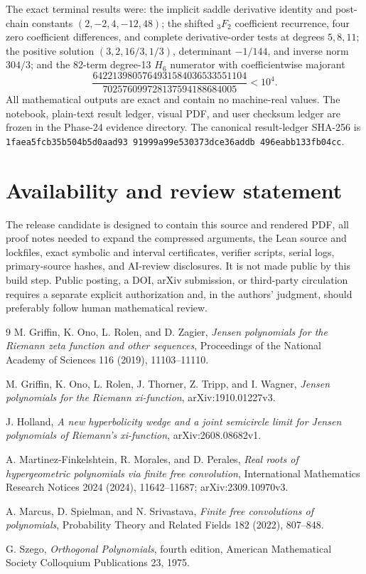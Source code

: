\documentclass[11pt]{article}
\theoremstyle{definition}
\theoremstyle{remark}
\begin{document}
The exact terminal results were: the implicit saddle derivative identity and
post-chain constants $(2,-2,4,-12,48)$; the shifted ${}_3F_2$ coefficient
recurrence, four zero coefficient differences, and complete derivative-order
tests at degrees $5,8,11$; the positive solution
$(3,2,16/3,1/3)$, determinant $-1/144$, and inverse norm $304/3$; and the
82-term degree-13 $H_6$ numerator with coefficientwise majorant
\[
 \frac{6422139805764931584036533551104}
 {702576099728137594188684005}<10^4.
\]
All mathematical outputs are exact and contain no machine-real values.  The
notebook, plain-text result ledger, visual PDF, and user checksum ledger are
frozen in the Phase-24 evidence directory.  The canonical result-ledger
SHA-256 is
\texttt{1faea5fc\allowbreak b35b504b\allowbreak 5d0aad93\allowbreak
91999a99\allowbreak e530373d\allowbreak ce36addb\allowbreak
496eabb1\allowbreak 33fb04cc}.

\section{Availability and review statement}

The release candidate is designed to contain this source and rendered PDF,
all proof notes needed to expand the compressed arguments, the Lean source
and lockfiles, exact symbolic and interval certificates, verifier scripts,
serial logs, primary-source hashes, and AI-review disclosures.  It is not
made public by this build step.  Public posting, a DOI, arXiv submission, or
third-party circulation requires a separate explicit authorization and, in
the authors' judgment, should preferably follow human mathematical review.

\begin{thebibliography}{9}
M. Griffin, K. Ono, L. Rolen, and D. Zagier,
\emph{Jensen polynomials for the Riemann zeta function and other sequences},
Proceedings of the National Academy of Sciences 116 (2019), 11103--11110.

M. Griffin, K. Ono, L. Rolen, J. Thorner, Z. Tripp, and I. Wagner,
\emph{Jensen polynomials for the Riemann xi-function},
arXiv:1910.01227v3.

J. Holland,
\emph{A new hyperbolicity wedge and a joint semicircle limit for Jensen
polynomials of Riemann's xi-function}, arXiv:2608.08682v1.

A. Martinez-Finkelshtein, R. Morales, and D. Perales,
\emph{Real roots of hypergeometric polynomials via finite free convolution},
International Mathematics Research Notices 2024 (2024), 11642--11687;
arXiv:2309.10970v3.

A. Marcus, D. Spielman, and N. Srivastava,
\emph{Finite free convolutions of polynomials},
Probability Theory and Related Fields 182 (2022), 807--848.

G. Szego, \emph{Orthogonal Polynomials}, fourth edition,
American Mathematical Society Colloquium Publications 23, 1975.
\end{thebibliography}
\end{document}
